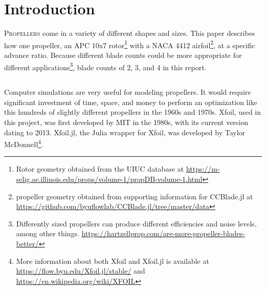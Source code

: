 \documentclass[journal ]{new-aiaa}
\begin{document}
\section{Introduction}

\lettrine{P}{ropellers} come in a variety of different shapes and sizes. This paper describes how  one propeller, an APC 10x7 rotor\footnote{Rotor geometry obtained from the UIUC database at \url{https://m-selig.ae.illinois.edu/props/volume-1/propDB-volume-1.html}} with a NACA 4412 airfoil\footnote{propeller geometry obtained from supporting information for CCBlade.jl at \url{https://github.com/byuflowlab/CCBlade.jl/tree/master/data}},   at a specific advance ratio. Because different blade counts could be more appropriate for different applications\footnote{Differently sized propellers can produce different efficiencies and noise levels, among other things. \url{https://hartzellprop.com/are-more-propeller-blades-better/}},  blade counts of 2, 3, and 4  in this report.  

\subsection{}

Computer simulations are very useful for modeling propellers. It would require significant investment of time, space, and money to perform an optimization like this    hundreds of slightly different propellers    in the 1960s and 1970s. Xfoil,   used in this project, was first developed by MIT in the 1980s, with its current version dating to 2013. Xfoil.jl, the Julia wrapper for Xfoil, was developed by Taylor McDonnell\footnote{More information about both Xfoil and Xfoil.jl is available at \url{https://flow.byu.edu/Xfoil.jl/stable/} and \url{https://en.wikipedia.org/wiki/XFOIL}}.
\end{document}

